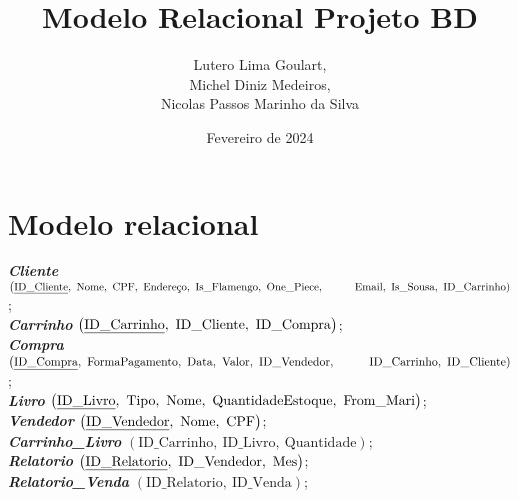 \documentclass{article}
\title{Modelo Relacional Projeto BD}
\author{Lutero Lima Goulart, \\Michel Diniz Medeiros, \\Nicolas Passos Marinho da Silva}
\date{Fevereiro de 2024}
\begin{document}
\maketitle

\newpage

\section{Modelo relacional}

\textit{\textbf{Cliente}} $\left( \text{\underline{ID\_Cliente}}, ~\text{Nome}, ~\text{CPF}, ~\text{Endereço}, ~\text{Is\_Flamengo}, ~\text{One\_Piece}, \right.
\\[2pt] \left. \phantom{aaaa}~ \text{Email}, ~\text{Is\_Sousa}, ~\text{ID\_Carrinho} \right)$;
\\[3pt]
\textit{\textbf{Carrinho}} $\left( \text{\underline{ID\_Carrinho}},~\text{ID\_Cliente}, ~\text{ID\_Compra}\right)$;
\\[3pt]
\textit{\textbf{Compra}} $\left( \text{\underline{ID\_Compra}}, ~\text{FormaPagamento}, ~\text{Data}, ~\text{Valor}, ~\text{ID\_Vendedor}, \right. 
\\[2pt] \left. \phantom{aaaa}~ \text{ID\_Carrinho}, ~\text{ID\_Cliente}\right)$;
\\[3pt]
\textit{\textbf{Livro}} $\left( \text{\underline{ID\_Livro}}, ~\text{Tipo}, ~\text{Nome}, ~\text{QuantidadeEstoque}, ~\text{From\_Mari}\right)$;
\\[3pt]
\textit{\textbf{Vendedor}} $\left( \text{\underline{ID\_Vendedor}}, ~\text{Nome}, ~\text{CPF} \right)$;
\\[3pt]
\textit{\textbf{Carrinho\_Livro}} $\left( \text{ID\_Carrinho}, ~\text{ID\_Livro}, ~\text{Quantidade} \right)$;
\\[3pt]\textit{\textbf{Relatorio}} $\left(  \text{\underline{ID\_Relatorio}}, ~\text{ID\_Vendedor}, ~\text{Mes}\right)$;
\\[3pt]
\textit{\textbf{Relatorio\_Venda}} $\left(\text{ID\_Relatorio}, ~\text{ID\_Venda}  \right)$;
\end{document}
